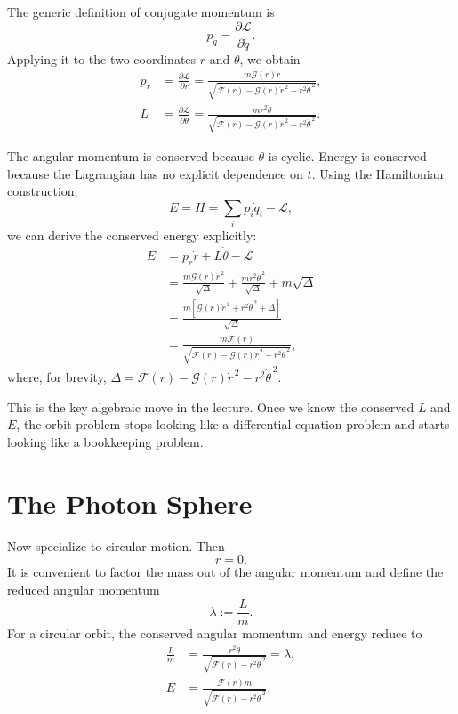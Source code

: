The generic definition of conjugate momentum is
\begin{equation}
p_{q}=\frac{\partial \mathcal L}{\partial \dot q}.
\end{equation}
Applying it to the two coordinates \(r\) and \(\theta\), we obtain
\begin{align}
p_{r}
&=
\frac{\partial \mathcal L}{\partial \dot r}
=
\frac{m\mathcal G(r)\dot r}
{\sqrt{\mathcal F(r)-\mathcal G(r)\dot r^{\,2}-r^{2}\dot\theta^{\,2}}}, \\
L
&=
\frac{\partial \mathcal L}{\partial \dot\theta}
=
\frac{mr^{2}\dot\theta}
{\sqrt{\mathcal F(r)-\mathcal G(r)\dot r^{\,2}-r^{2}\dot\theta^{\,2}}}.
\end{align}

The angular momentum is conserved because \(\theta\) is cyclic. Energy is conserved because the Lagrangian has no explicit dependence on \(t\). Using the Hamiltonian construction,
\begin{equation}
E=H=\sum_{i}p_{i}\dot q_{i}-\mathcal L,
\end{equation}
we can derive the conserved energy explicitly:
\begin{align}
E
&=
p_{r}\dot r+L\dot\theta-\mathcal L \\
&=
\frac{m\mathcal G(r)\dot r^{\,2}}{\sqrt{\Delta}}
+
\frac{mr^{2}\dot\theta^{\,2}}{\sqrt{\Delta}}
+
m\sqrt{\Delta} \\
&=
\frac{m\left[\mathcal G(r)\dot r^{\,2}+r^{2}\dot\theta^{\,2}+\Delta\right]}{\sqrt{\Delta}} \\
&=
\frac{m\mathcal F(r)}
{\sqrt{\mathcal F(r)-\mathcal G(r)\dot r^{\,2}-r^{2}\dot\theta^{\,2}}},
\end{align}
where, for brevity, \(\Delta=\mathcal F(r)-\mathcal G(r)\dot r^{\,2}-r^{2}\dot\theta^{\,2}\).

This is the key algebraic move in the lecture. Once we know the conserved \(L\) and \(E\), the orbit problem stops looking like a differential-equation problem and starts looking like a bookkeeping problem.

\section{The Photon Sphere}

Now specialize to circular motion. Then
\begin{equation}
\dot r=0.
\end{equation}
It is convenient to factor the mass out of the angular momentum and define the reduced angular momentum
\begin{equation}
\lambda:=\frac{L}{m}.
\end{equation}
For a circular orbit, the conserved angular momentum and energy reduce to
\begin{align}
\frac{L}{m}
&=
\frac{r^{2}\dot\theta}
{\sqrt{\mathcal F(r)-r^{2}\dot\theta^{\,2}}}
=
\lambda, \\
E
&=
\frac{\mathcal F(r)m}
{\sqrt{\mathcal F(r)-r^{2}\dot\theta^{\,2}}}.
\end{align}

